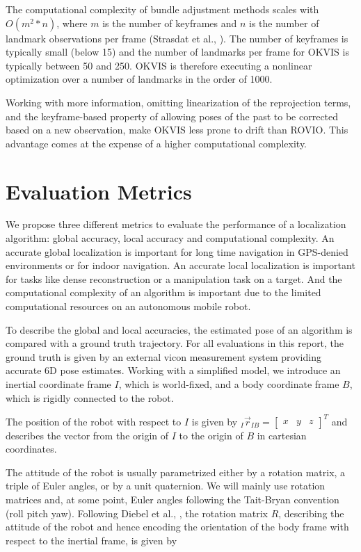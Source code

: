 The computational complexity of bundle adjustment methods scales with $O(m^2*n)$, where $m$ is the number of keyframes and $n$ is the number of landmark observations per frame (Strasdat et al., \cite{strasdat2010real}). The number of keyframes is typically small (below 15) and the number of landmarks per frame for OKVIS is typically between 50 and 250. OKVIS is therefore executing a nonlinear optimization over a number of landmarks in the order of 1000. 

Working with more information, omitting linearization of the reprojection terms, and the keyframe-based property of allowing poses of the past to be corrected based on a new observation, make OKVIS less prone to drift than ROVIO. This advantage comes at the expense of a higher computational complexity.



\section{Evaluation Metrics}
\label{sec:metrics}

We propose three different metrics to evaluate the performance of a localization algorithm: global accuracy, local accuracy and computational complexity. An accurate global localization is important for long time navigation in GPS-denied environments or for indoor navigation. An accurate local localization is important for tasks like dense reconstruction or a manipulation task on a target. And the computational complexity of an algorithm is important due to the limited computational resources on an autonomous mobile robot.

To describe the global and local accuracies, the estimated pose of an algorithm is compared with a ground truth trajectory. For all evaluations in this report, the ground truth is given by an external vicon measurement system providing accurate 6D pose estimates. Working with a simplified model, we introduce an inertial coordinate frame $I$, which is world-fixed, and a body coordinate frame $B$, which is rigidly connected to the robot. 

The position of the robot with respect to $I$ is given by $_I \vec{r}_{IB} = \left[ \begin{array}{ccc} x& y& z \end{array} \right]^T$ and describes the vector from the origin of $I$ to the origin of $B$ in cartesian coordinates. 

The attitude of the robot is usually parametrized either by a rotation matrix, a triple of Euler angles, or by a unit quaternion. We will mainly use rotation matrices and, at some point, Euler angles following the Tait-Bryan convention (roll pitch yaw). Following Diebel et al., \cite{diebel2006representing}, the rotation matrix $R$, describing the attitude of the robot and hence encoding the orientation of the body frame with respect to the inertial frame, is given by 

